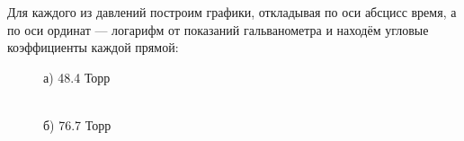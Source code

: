 \documentclass[a4paper, fontsize=12bp]{article}
\begin{document}
Для каждого из давлений построим графики, откладывая по оси абсцисс время, а по оси ординат --- логарифм от показаний гальванометра и находём угловые коэффициенты каждой прямой:
\begin{figure}[H]
\begin{minipage}[h]{0.47\linewidth}
 а) 48.4 Торр \\
\end{minipage}
\hfill
\begin{minipage}[h]{0.47\linewidth}
 \\б) 76.7 Торр
\end{minipage}

\end{figure}
\end{document}
